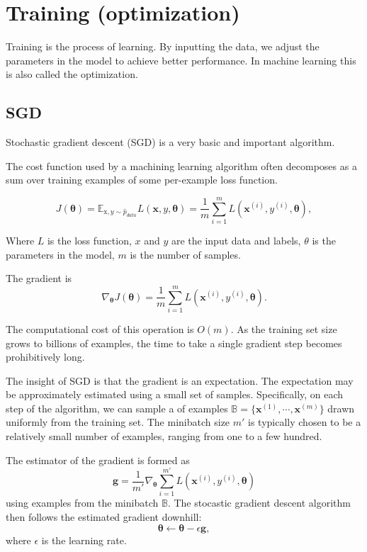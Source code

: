 
\chapter{Training (optimization)}
\label{cha:training}

Training is the process of learning.
By inputting the data, we adjust the parameters in the model to achieve better performance.
In machine learning this is also called the optimization.


\section{SGD}
\label{sec:sgd}
Stochastic gradient descent (SGD) is a very basic and important algorithm.

The cost function used by a machining learning algorithm often decomposes as a sum over training examples of some per-example loss function.

\begin{equation}
  J(\bm{\theta}) = \mathbb{E}_{\mathrm{x},y \sim \hat{p}_{data}} L(\bm{x},y,\bm{\theta}) = \frac{1}{m}\sum_{i=1}^m L(\bm{x}^{(i)},y^{(i)},\bm{\theta}),
\end{equation}

Where \(L\) is the loss function, \(x\) and \(y\) are the input data and labels, \(\theta\) is the parameters in the model, \(m\) is the number of samples.


The gradient is
\begin{equation}
  \nabla_{\bm{\theta}} J(\bm{\theta}) = \frac{1}{m}\sum_{i=1}^m L(\bm{x}^{(i)},y^{(i)},\bm{\theta}).
\end{equation}

The computational cost of this operation is $O(m)$.
As the training set size grows to billions of examples, the time to take a single gradient step becomes prohibitively long.

The insight of SGD is that the gradient is an expectation.
The expectation may be approximately estimated using a small set of samples.
Specifically, on each step of the algorithm, we can sample a  of examples $\mathbb{B}=\{\bm{x}^{(1)},\cdots,\bm{x}^{(m)}\}$ drawn uniformly from the training set.
The minibatch size $m'$ is typically chosen to be a relatively small number of examples, ranging from one to a few hundred.

The estimator of the gradient is formed as
\begin{equation}
  \bm{g} = \frac{1}{m'} \nabla_{\bm{\theta}} \sum_{i=1}^{m'} L(\bm{x}^{(i)},y^{(i)},\bm{\theta})
\end{equation}
using examples from the minibatch $\mathbb{B}$.
The stocastic gradient descent algorithm then follows the estimated gradient downhill:
\begin{equation}
  \bm{\theta} \leftarrow \bm{\theta} - \epsilon \bm{g},
\end{equation}
where $\epsilon$ is the learning rate.

